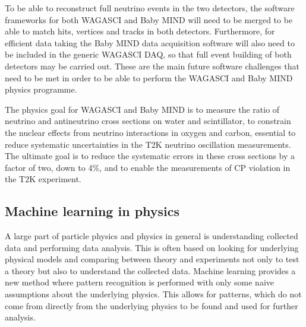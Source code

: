 

To be able to reconstruct full neutrino events in the two detectors, the software frameworks for both WAGASCI and Baby MIND will need to be merged to be able to match hits, vertices and tracks in both detectors. Furthermore, for efficient data taking the Baby MIND data acquisition software will also need to be included in the generic WAGASCI DAQ, so that full event building of both detectors may be carried out. These are the main future software challenges that need to be met in order to be able to perform the WAGASCI and Baby MIND physics programme. 

The physics goal for WAGASCI and Baby MIND is to measure the ratio of neutrino and antineutrino cross sections on water and scintillator, to constrain the nuclear effects from neutrino interactions in oxygen and carbon, essential to reduce systematic uncertainties in the T2K neutrino oscillation measurements. The ultimate goal is to reduce the systematic errors in these cross sections by a factor of two, down to 4\%, and to enable the measurements of CP violation in the T2K experiment.



\subsection{Machine learning in physics}

A large part of particle physics and physics in general is understanding collected data and performing data analysis. This is often based on looking for underlying physical models and comparing between theory and experiments not only to test a theory but also to understand the collected data. Machine learning provides a new method where pattern recognition is performed with only some naive assumptions about the underlying physics. This allows for patterns, which do not come from directly from the underlying physics to be found and used for further analysis.

